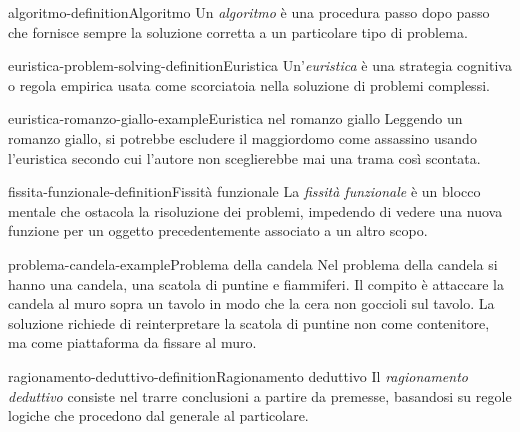 \documentclass[preview]{standalone}
\begin{document}
\begin{snippetdefinition}{algoritmo-definition}{Algoritmo}
    Un \emph{algoritmo} è una procedura passo dopo passo che fornisce sempre la
    soluzione corretta a un particolare tipo di problema.
\end{snippetdefinition}

\begin{snippetdefinition}{euristica-problem-solving-definition}{Euristica}
    Un'\emph{euristica} è una strategia cognitiva o regola empirica usata come
    scorciatoia nella soluzione di problemi complessi.
\end{snippetdefinition}

\begin{snippetexample}{euristica-romanzo-giallo-example}{Euristica nel romanzo giallo}
    Leggendo un romanzo giallo, si potrebbe escludere il maggiordomo come
    assassino usando l'euristica secondo cui l'autore non sceglierebbe mai una
    trama così scontata.
\end{snippetexample}

\begin{snippetdefinition}{fissita-funzionale-definition}{Fissità funzionale}
    La \emph{fissità funzionale} è un blocco mentale che ostacola la risoluzione
    dei problemi, impedendo di vedere una nuova funzione per un oggetto
    precedentemente associato a un altro scopo.
\end{snippetdefinition}

\begin{snippetexample}{problema-candela-example}{Problema della candela}
    Nel problema della candela si hanno una candela, una scatola di puntine e
    fiammiferi. Il compito è attaccare la candela al muro sopra un tavolo in
    modo che la cera non goccioli sul tavolo. La soluzione richiede di
    reinterpretare la scatola di puntine non come contenitore, ma come
    piattaforma da fissare al muro.
\end{snippetexample}


\begin{snippetdefinition}{ragionamento-deduttivo-definition}{Ragionamento deduttivo}
    Il \emph{ragionamento deduttivo} consiste nel trarre conclusioni a partire
    da premesse, basandosi su regole logiche che procedono dal generale al
    particolare.
\end{snippetdefinition}
\end{document}
